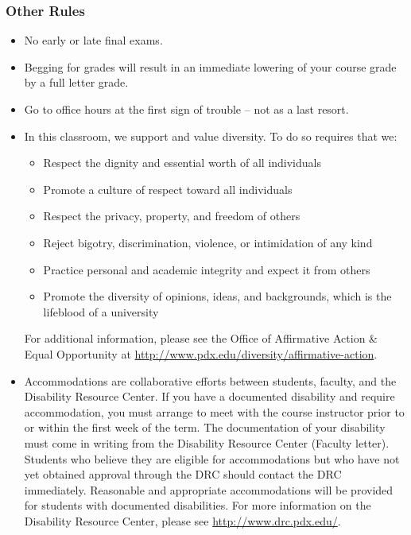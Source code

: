\documentclass[letterpaper,10pt]{article}
\begin{document}
\subsubsection{Other Rules}
\begin{itemize}

\item No early or late final exams.

\item Begging for grades will result in an immediate lowering of your
  course grade by a full letter grade.

\item Go to office hours at the first sign of trouble -- not as a last
  resort.

\item In this classroom, we support and value diversity.  To do so requires that we:
\begin{itemize}
   \item Respect the dignity and essential worth of all individuals
   \item Promote a culture of respect toward all individuals
    \item Respect the privacy, property, and freedom of others
    \item Reject bigotry, discrimination, violence, or intimidation of any kind
    \item Practice personal and academic integrity and expect it from others
   \item Promote the diversity of opinions, ideas, and backgrounds, which is
    the lifeblood of a university
\end{itemize}

 For additional information, please see the Office of Affirmative Action \& Equal Opportunity at \url{http://www.pdx.edu/diversity/affirmative-action}.


\item Accommodations are collaborative efforts between students, faculty, and the Disability Resource Center.  If you have a documented disability and require accommodation, you must arrange to meet with the course instructor prior to or within the first week of the term.  The documentation of your disability must come in writing from the Disability Resource Center (Faculty letter).  Students who believe they are eligible for accommodations but who have not yet obtained approval through the DRC should contact the DRC immediately.  Reasonable and appropriate accommodations will be provided for students with documented disabilities.  For more information on the Disability Resource Center, please see \url{http://www.drc.pdx.edu/}. 


\end{itemize}
\end{document}
